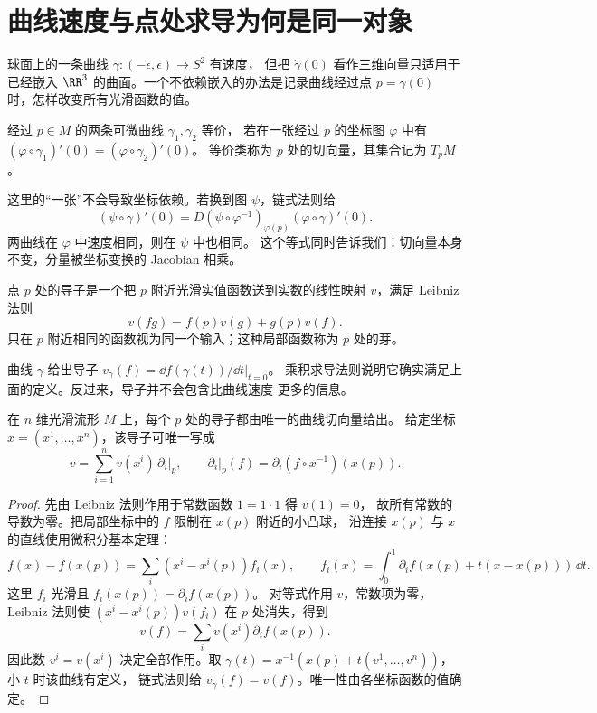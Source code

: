 \section{曲线速度与点处求导为何是同一对象}
\label{sec:math-tangent-derivations}

球面上的一条曲线 \(\gamma:(-\epsilon,\epsilon)\to S^2\) 有速度，
但把 \(\dot\gamma(0)\) 看作三维向量只适用于已经嵌入
\(\RR^3\) 的曲面。一个不依赖嵌入的办法是记录曲线经过点
\(p=\gamma(0)\) 时，怎样改变所有光滑函数的值。

\begin{definition}[曲线切向量]
经过 \(p\in M\) 的两条可微曲线 \(\gamma_1,\gamma_2\) 等价，
若在一张经过 \(p\) 的坐标图 \(\varphi\) 中有
\((\varphi\circ\gamma_1)'(0)=(\varphi\circ\gamma_2)'(0)\)。
等价类称为 \(p\) 处的切向量，其集合记为 \(T_pM\)。
\end{definition}

这里的“一张”不会导致坐标依赖。若换到图 \(\psi\)，链式法则给
\[
(\psi\circ\gamma)'(0)
=D(\psi\circ\varphi^{-1})_{\varphi(p)}
(\varphi\circ\gamma)'(0).
\]
两曲线在 \(\varphi\) 中速度相同，则在 \(\psi\) 中也相同。
这个等式同时告诉我们：切向量本身不变，分量被坐标变换的 Jacobian 相乘。

\begin{definition}[点处导子]
点 \(p\) 处的导子是一个把 \(p\) 附近光滑实值函数送到实数的线性映射
\(v\)，满足 Leibniz 法则
\[
v(fg)=f(p)v(g)+g(p)v(f).
\]
只在 \(p\) 附近相同的函数视为同一个输入；这种局部函数称为 \(p\) 处的芽。
\end{definition}

曲线 \(\gamma\) 给出导子
\(v_\gamma(f)=\left.\dd f(\gamma(t))/\dd t\right|_{t=0}\)。
乘积求导法则说明它确实满足上面的定义。反过来，导子并不会包含比曲线速度
更多的信息。

\begin{theorem}[曲线定义与导子定义的对应]
在 \(n\) 维光滑流形 \(M\) 上，每个 \(p\) 处的导子都由唯一的曲线切向量给出。
给定坐标 \(x=(x^1,\ldots,x^n)\)，该导子可唯一写成
\[
v=\sum_{i=1}^n v(x^i)\,\partial_i\big|_p,\qquad
\partial_i\big|_p(f)=\partial_i(f\circ x^{-1})(x(p)).
\]
\end{theorem}
\begin{proof}
先由 Leibniz 法则作用于常数函数 \(1=1\cdot1\) 得 \(v(1)=0\)，
故所有常数的导数为零。把局部坐标中的 \(f\) 限制在 \(x(p)\) 附近的小凸球，
沿连接 \(x(p)\) 与 \(x\) 的直线使用微积分基本定理：
\[
f(x)-f(x(p))
=\sum_i(x^i-x^i(p))f_i(x),\qquad
f_i(x)=\int_0^1\partial_i f(x(p)+t(x-x(p)))\,\dd t.
\]
这里 \(f_i\) 光滑且 \(f_i(x(p))=\partial_i f(x(p))\)。
对等式作用 \(v\)，常数项为零，Leibniz 法则使
\((x^i-x^i(p))v(f_i)\) 在 \(p\) 处消失，得到
\[
v(f)=\sum_i v(x^i)\partial_i f(x(p)).
\]
因此数 \(v^i=v(x^i)\) 决定全部作用。取
\(\gamma(t)=x^{-1}(x(p)+t(v^1,\ldots,v^n))\)，小 \(t\) 时该曲线有定义，
链式法则给 \(v_\gamma(f)=v(f)\)。唯一性由各坐标函数的值确定。
\end{proof}

